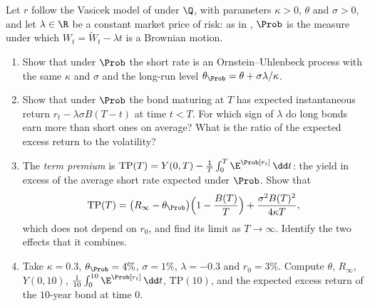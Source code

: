 \begin{exercise}\label{ex:ir-term-premium}
\easy Let $r$ follow the Vasicek model of  under $\Q$, with parameters
$\kappa>0$, $\theta$ and $\sigma>0$, and let $\lambda\in\R$ be a constant market price of risk: as in
, $\Prob$ is the measure under which $W_t=\widetilde W_t-\lambda t$ is a
Brownian motion.
\begin{enumerate}[label=(\alph*)]
  \item Show that under $\Prob$ the short rate is an Ornstein--Uhlenbeck process with the same
    $\kappa$ and $\sigma$ and the long-run level $\theta_\Prob=\theta+\sigma\lambda/\kappa$.
  \item Show that under $\Prob$ the bond maturing at $T$ has expected instantaneous return
    $r_t-\lambda\sigma B(T-t)$ at time $t<T$. For which sign of $\lambda$ do long bonds earn more than
    short ones on average? What is the ratio of the expected excess return to the volatility?
  \item The \emph{term premium} is $\mathrm{TP}(T)=Y(0,T)-\frac1T\int_0^T\E^\Prob[r_t]\,\dd t$: the yield
    in excess of the average short rate expected under $\Prob$. Show that
    \[
      \mathrm{TP}(T)=\big(R_\infty-\theta_\Prob\big)\Big(1-\frac{B(T)}T\Big)+\frac{\sigma^2B(T)^2}{4\kappa T},
    \]
    which does not depend on $r_0$, and find its limit as $T\to\infty$. Identify the two effects that
    it combines.
  \item Take $\kappa=0.3$, $\theta_\Prob=4\%$, $\sigma=1\%$, $\lambda=-0.3$ and $r_0=3\%$. Compute $\theta$,
    $R_\infty$, $Y(0,10)$, $\frac1{10}\int_0^{10}\E^\Prob[r_t]\,\dd t$, $\mathrm{TP}(10)$, and the expected
    excess return of the $10$-year bond at time $0$.
\end{enumerate}
\end{exercise}

